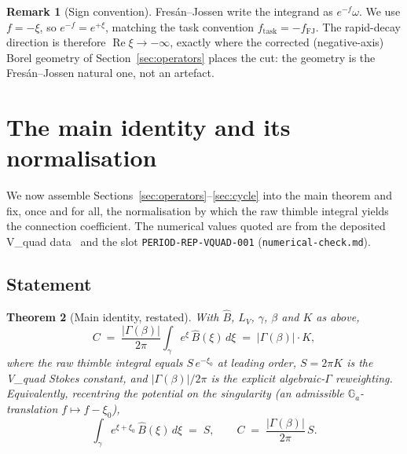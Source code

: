 \documentclass[11pt,reqno]{amsart}
\theoremstyle{plain}
\newtheorem{theorem}{Theorem}[section]
\theoremstyle{definition}
\newtheorem{remark}[theorem]{Remark}
\newcommand{\Bhat}{\widehat{B}}
\newcommand{\LV}{L_{V}}
\newcommand{\xizero}{\xi_0}
\providecommand{\C}{}\renewcommand{\C}{C}
\begin{document}
\begin{remark}[Sign convention]\label{rmk:fjsign}
Fres\'an--Jossen write the integrand as $e^{-f}\omega$. We use $f=-\xi$, so $e^{-f}=e^{+\xi}$,
matching the task convention $f_{\mathrm{task}}=-f_{\mathrm{FJ}}$. The rapid-decay direction is
therefore $\operatorname{Re}\xi\to-\infty$, exactly where the corrected (negative-axis) Borel
geometry of Section~\ref{sec:operators} places the cut: the geometry is the Fres\'an--Jossen
natural one, not an artefact.
\end{remark}

\section{The main identity and its normalisation}\label{sec:main}

We now assemble Sections~\ref{sec:operators}--\ref{sec:cycle} into the main theorem and fix, once
and for all, the normalisation by which the raw thimble integral yields the connection
coefficient. The numerical values quoted are from the deposited V\_quad data~\cite{Vquad,StokesNote}
and the slot \texttt{PERIOD-REP-VQUAD-001} (\texttt{numerical-check.md}).

\subsection{Statement}
\begin{theorem}[Main identity, restated]\label{thm:main-restated}
With $\Bhat$, $\LV$, $\gamma$, $\beta$ and $K$ as above,
\begin{equation}\label{eq:main-again}
  \C\;=\;\frac{\lvert\Gamma(\beta)\rvert}{2\pi}\int_{\gamma}e^{\xi}\,\Bhat(\xi)\,d\xi
  \;=\;\lvert\Gamma(\beta)\rvert\cdot K ,
\end{equation}
where the raw thimble integral equals $S\,e^{-\xizero}$ at leading order, $S=2\pi K$ is the
V\_quad Stokes constant, and $\lvert\Gamma(\beta)\rvert/2\pi$ is the explicit algebraic-$\Gamma$
reweighting. Equivalently, recentring the potential on the singularity
(an admissible $\mathbb{G}_a$-translation $f\mapsto f-\xizero$),
\begin{equation}\label{eq:main-recentred}
  \int_\gamma e^{\xi+\xizero}\,\Bhat(\xi)\,d\xi\;=\;S,\qquad
  \C\;=\;\frac{\lvert\Gamma(\beta)\rvert}{2\pi}\,S .
\end{equation}
\end{theorem}
\end{document}
